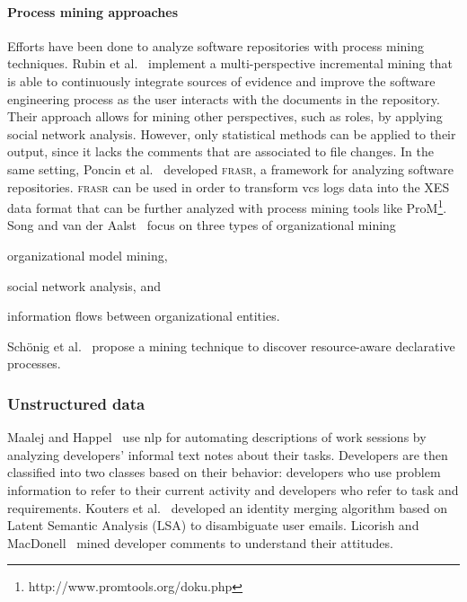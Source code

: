 \paragraph{Process mining approaches}
Efforts have been done to analyze software repositories with process mining techniques. Rubin et al.~\cite{rubin2007process} implement a multi-perspective incremental mining that is able to continuously integrate sources of evidence and improve the software engineering process as the user interacts with the documents in the repository. Their approach allows for mining other perspectives, such as roles, by applying social network analysis. However, only statistical methods can be applied to their output, since it lacks the comments that are associated to file changes. In the same setting, Poncin et al.~\cite{Poncin2011} developed \textsc{frasr}, a framework for analyzing software repositories. \textsc{frasr} can be used in order to transform \gls*{vcs} logs data into the XES~\cite{verbeek2010xes} data format that can be further analyzed with process mining tools like ProM\footnote{http://www.promtools.org/doku.php}. 
Song and van der Aalst~\cite{Song2008} focus on three types of organizational mining 
\begin{inparaenum}[\itshape i)]
   \item organizational model mining, 
   \item social network analysis, and 
   \item information flows between organizational entities.
\end{inparaenum} Schönig et al.~\cite{Schonig2015} propose a mining technique to discover resource-aware declarative processes.

\subsubsection{Unstructured data} Maalej and Happel~\cite{Maalej2010} use \gls*{nlp} for automating descriptions of work sessions by analyzing developers' informal text notes about their tasks. Developers are then classified into two classes based on their behavior: developers who use problem information to refer to their current activity and developers who refer to task and requirements. Kouters et al.~\cite{Kouters2012} developed an identity merging algorithm based on Latent Semantic Analysis (LSA) to disambiguate user emails. Licorish and MacDonell~\cite{Licorish2014} mined developer comments to understand their attitudes.

